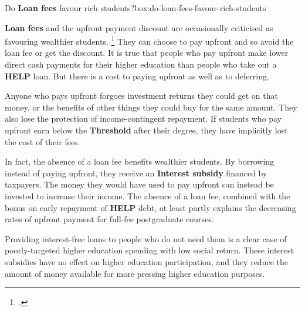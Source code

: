 \documentclass[continuous]{grattan}
\begin{document}
\newcommand{\gls}[1]{\textbf{#1}}
\newcommand{\Gls}[1]{\textbf{#1}}
\begin{smallbox}{Do \gls{Loan fees} favour rich students?}{box:do-loan-fees-favour-rich-students}

\Gls{Loan fees} and the upfront payment discount are occasionally criticised as favouring wealthier students.%
\footcites{Hare-2015-loan-fees-advantage-the-rich}{Evans2011MediareleaseGillard} %
They can choose to pay upfront and so avoid the loan fee or get the discount.
It is true that people who pay upfront make lower direct cash payments for their higher education than people who take out a \gls{HELP} loan.
But there is a cost to paying upfront as well as to deferring.

Anyone who pays upfront forgoes investment returns they could get on that money, or the benefits of other things they could buy for the same amount.
They also lose the protection of income-contingent repayment.
If students who pay upfront earn below the \gls{Threshold} after their degree, they have implicitly lost the cost of their fees.

In fact, the absence of a loan fee benefits wealthier students.
By borrowing instead of paying upfront, they receive an \gls{Interest subsidy} financed by taxpayers.
The money they would have used to pay upfront can instead be invested to increase their income.
The absence of a loan fee, combined with the bonus on early repayment of \gls{HELP} debt, at least partly explains the decreasing rates of upfront payment for full-fee postgraduate courses.

Providing interest-free loans to people who do not need them is a clear case of poorly-targeted higher education spending with low social return.
These interest subsidies have no effect on higher education participation, and they reduce the amount of money available for more pressing higher education purposes.
\end{smallbox}
\printbibliography

\blinddocument

\the\baselineskip
\end{document}
